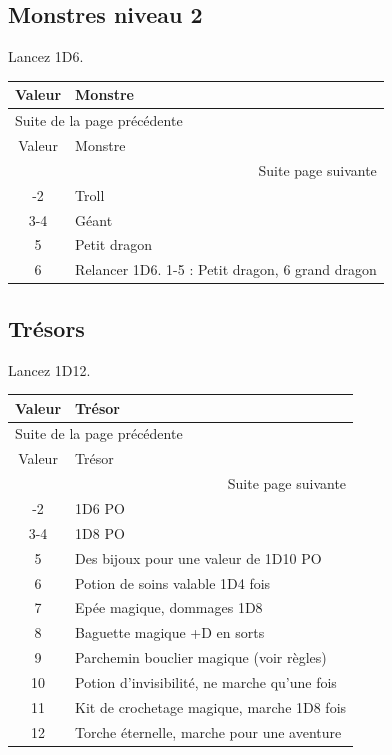 \documentclass[a4paper, 11pt, twoside]{article}
\begin{document}
\subsection{Monstres niveau 2}
\label{sec:org1fa50b4}

Lancez 1D6.

\begin{longtable}{c|l}
Valeur & Monstre\\
\hline
\endfirsthead
\multicolumn{2}{l}{Suite de la page précédente} \\
\hline

Valeur & Monstre \\

\hline
\endhead
\hline\multicolumn{2}{r}{Suite page suivante} \\
\endfoot
\endlastfoot
\hline
1-2 & Troll\\
3-4 & Géant\\
5 & Petit dragon\\
6 & Relancer 1D6. 1-5 : Petit dragon, 6 grand dragon\\
\end{longtable}


\subsection{Trésors}
\label{sec:orgd5d7783}

Lancez 1D12.

\begin{longtable}{c|l}
Valeur & Trésor\\
\hline
\endfirsthead
\multicolumn{2}{l}{Suite de la page précédente} \\
\hline

Valeur & Trésor \\

\hline
\endhead
\hline\multicolumn{2}{r}{Suite page suivante} \\
\endfoot
\endlastfoot
\hline
1-2 & 1D6 PO\\
3-4 & 1D8 PO\\
5 & Des bijoux pour une valeur de 1D10 PO\\
6 & Potion de soins valable 1D4 fois\\
7 & Epée magique, dommages 1D8\\
8 & Baguette magique +D en sorts\\
9 & Parchemin bouclier magique (voir règles)\\
10 & Potion d'invisibilité, ne marche qu'une fois\\
11 & Kit de crochetage magique, marche 1D8 fois\\
12 & Torche éternelle, marche pour une aventure\\
\end{longtable}
\end{document}
